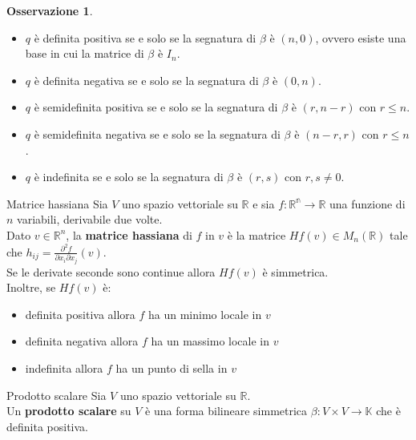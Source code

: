 \documentclass[a4paper]{article}
\theoremstyle{definition}
\newtheorem*{oss}{Osservazione}
\begin{document}
	\begin{oss}
		\begin{itemize}
			\item $q$ è definita positiva se e solo se la segnatura di $\beta$ è $(n, 0)$, ovvero esiste una base in cui la matrice di $\beta$ è $I_n$.
			\item $q$ è definita negativa se e solo se la segnatura di $\beta$ è $(0, n)$.
			\item $q$ è semidefinita positiva se e solo se la segnatura di $\beta$ è $(r, n - r)$ con $r \le n$.
			\item $q$ è semidefinita negativa se e solo se la segnatura di $\beta$ è $(n - r, r)$ con $r \le n$.
			\item $q$ è indefinita se e solo se la segnatura di $\beta$ è $(r, s)$ con $r, s \ne 0$.
		\end{itemize}
	\end{oss}

	\begin{deff}{Matrice hassiana}{}
		Sia $V$ uno spazio vettoriale su $\mathbb{R}$ e sia $f: \mathbb{R^n} \to \mathbb{R}$ una funzione di $n$ variabili, derivabile due volte. \\
		Dato $v \in \mathbb{R}^n$, la \textbf{matrice hassiana} di $f$ in $v$ è la matrice $Hf(v) \in M_n(\mathbb{R})$ tale che $h_{ij} = \frac{\partial^2 f}{\partial x_i \partial x_j}(v)$. \\
		Se le derivate seconde sono continue allora $Hf(v)$ è simmetrica. \\
		Inoltre, se $Hf(v)$ è:
		\begin{itemize}
			\item definita positiva allora $f$ ha un minimo locale in $v$
			\item definita negativa allora $f$ ha un massimo locale in $v$
			\item indefinita allora $f$ ha un punto di sella in $v$
		\end{itemize}
	\end{deff}

	\begin{deff}{Prodotto scalare}{}
		Sia $V$ uno spazio vettoriale su $\mathbb{R}$. \\
		Un \textbf{prodotto scalare} su $V$ è una forma bilineare simmetrica $\beta: V \times V \to \mathbb{K}$ che è definita positiva.
	\end{deff}
\end{document}
